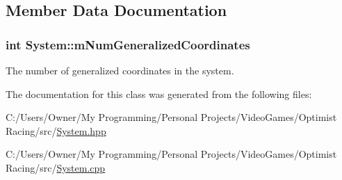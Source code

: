 \subsection{Member Data Documentation}
\hypertarget{class_system_aa06fade2f21b3282921a86a926f0ba1f}{
\subsubsection[{m\-Num\-Generalized\-Coordinates}]{\setlength{\rightskip}{0pt plus 5cm}int System\-::m\-Num\-Generalized\-Coordinates\hspace{0.3cm}{\ttfamily [protected]}}}\label{class_system_aa06fade2f21b3282921a86a926f0ba1f}


The number of generalized coordinates in the system. 



The documentation for this class was generated from the following files\-:\begin{DoxyCompactItemize}
\item 
C\-:/\-Users/\-Owner/\-My Programming/\-Personal Projects/\-Video\-Games/\-Optimist Racing/src/\hyperlink{_system_8hpp}{System.\-hpp}\item 
C\-:/\-Users/\-Owner/\-My Programming/\-Personal Projects/\-Video\-Games/\-Optimist Racing/src/\hyperlink{_system_8cpp}{System.\-cpp}\end{DoxyCompactItemize}
